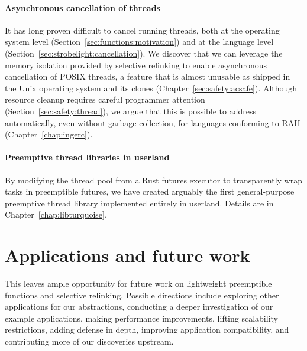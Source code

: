 \paragraph{Asynchronous cancellation of threads}
It has long proven difficult to cancel running threads, both at the operating system
level (Section~\ref{sec:functions:motivation}) and at the language level
(Section~\ref{sec:strobelight:cancellation}).  We
discover that we can leverage the memory isolation provided by selective relinking to
enable asynchronous cancellation of POSIX threads, a feature that is almost unusable
as shipped in the Unix operating system and its clones
(Chapter~\ref{sec:safety:acsafe}).  Although resource cleanup requires careful
programmer attention
(Section~\ref{sec:safety:thread}), we argue that this is possible to address
automatically, even without garbage collection, for languages conforming to RAII
(Chapter~\ref{chap:ingerc}).

\paragraph{Preemptive thread libraries in userland}
By modifying the thread pool from a Rust futures executor to transparently wrap
tasks in preemptible futures, we have created arguably the first general-purpose
preemptive thread library implemented entirely in userland.  Details are in
Chapter~\ref{chap:libturquoise}.


\section{Applications and future work}
\label{sec:thatsawrap:applications}

This \thesis leaves ample opportunity for future work on lightweight preemptible
functions and selective relinking.  Possible directions include exploring other
applications for our abstractions, conducting a deeper investigation of our example
applications, making performance improvements, lifting scalability restrictions,
adding defense in depth, improving application compatibility, and contributing more
of our discoveries upstream.

